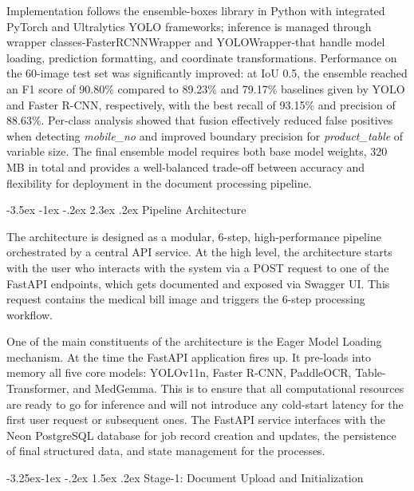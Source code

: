 \documentclass[conference,twocolumn]{IEEEtran}
\makeatletter
\renewcommand{\section}{\@startsection{section}{1}{\z@}%
  {-3.5ex \@plus -1ex \@minus -.2ex}%
  {2.3ex \@plus.2ex}%
  {\normalfont\large\bfseries\centering}}
\renewcommand{\subsection}{\@startsection{subsection}{2}{\z@}%
  {-3.25ex\@plus -1ex \@minus -.2ex}%
  {1.5ex \@plus .2ex}%
  {\normalfont\normalsize\bfseries\itshape}}
\makeatother
\begin{document}
Implementation follows the ensemble-boxes library in Python with
integrated PyTorch and Ultralytics YOLO frameworks; inference is managed
through wrapper classes-FasterRCNNWrapper and YOLOWrapper-that handle
model loading, prediction formatting, and coordinate transformations.
Performance on the 60-image test set was significantly improved: at IoU
0.5, the ensemble reached an F1 score of 90.80\% compared to 89.23\% and
79.17\% baselines given by YOLO and Faster R-CNN, respectively, with the
best recall of 93.15\% and precision of 88.63\%. Per-class analysis
showed that fusion effectively reduced false positives when detecting
\textit{mobile\_no} and improved boundary precision for
\textit{product\_table} of variable size. The final ensemble model
requires both base model weights, 320 MB in total and provides a
well-balanced trade-off between accuracy and flexibility for deployment
in the document processing pipeline.

\section{Pipeline Architecture}

The architecture is designed as a modular, 6-step, high-performance
pipeline orchestrated by a central API service. At the high level, the
architecture starts with the user who interacts with the system via a
POST request to one of the FastAPI endpoints, which gets documented and
exposed via Swagger UI. This request contains the medical bill image and
triggers the 6-step processing workflow.

One of the main constituents of the architecture is the Eager Model
Loading mechanism. At the time the FastAPI application fires up. It
pre-loads into memory all five core models: YOLOv11n, Faster R-CNN,
PaddleOCR, Table-Transformer, and MedGemma. This is to ensure that all
computational resources are ready to go for inference and will not
introduce any cold-start latency for the first user request or
subsequent ones. The FastAPI service interfaces with the Neon PostgreSQL
database for job record creation and updates, the persistence of final
structured data, and state management for the processes.

\subsection{Stage-1: Document Upload and Initialization}
\end{document}
